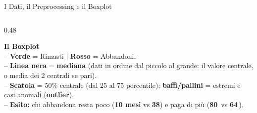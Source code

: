 \documentclass[aspectratio=169, 10pt]{beamer}
\newcommand{\card}[3]{%
    \colorbox{#1}{\parbox{\dimexpr#2-2\fboxsep\relax}{\raggedright #3}}%
}
\begin{document}
\begin{frame}{I Dati, il Preprocessing e il Boxplot}
\begin{columns}[c, onlytextwidth]
\begin{column}{0.48\textwidth}
            \vspace{1.5mm}
            \card{CardRed}{\linewidth}{\scriptsize
                \textbf{\color{AccentRed}\small Il Boxplot}\\[2pt]
                -- \textbf{\color{AccentGreen} Verde} = Rimasti \quad|\quad \textbf{\color{AccentRed} Rosso} = Abbandoni.\\[1.5pt]
                -- \textbf{Linea nera} = \textbf{mediana} (dati in ordine dal piccolo al grande: il valore centrale, o media dei 2 centrali se pari).\\
                -- \textbf{Scatola} = 50\% centrale (dal 25\textdegree{} al 75\textdegree{} percentile); \textbf{baffi/pallini} = estremi e casi anomali (\textbf{outlier}).\\[1.5pt]
                -- \textbf{Esito:} chi abbandona resta poco (\textbf{10 mesi} vs \textbf{38}) e paga di più (\textbf{80\,\texteuro} vs \textbf{64\,\texteuro}).
            }
        \end{column}
    \end{columns}
\end{frame}
\end{document}
